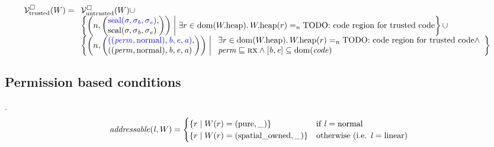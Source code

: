 \documentclass[a4paper]{article}
\begin{document}
\[
  \lrvtrusted(W) =
  \begin{array}[t]{l}
    \lrv(W)\cup \\
%
    \left\{ \npair{\left(\arraycolsep=0pt\array{l} \src{\seal{\sigma,\sigma_\baddr,\sigma_\eaddr}},\\ \seal{\sigma,\sigma_\baddr,\sigma_\eaddr} \endarray \right)} 
    \; \middle| \;
    \exists r \in \dom(\pwheap) \ldotp \pwheap(r) =_n \text{TODO: code region for trusted code}
    \right\} \cup \\
    \left\{ \npair{\left(\arraycolsep=0pt\array{l} \src{((\perm,\normal),\baddr,\eaddr,\aaddr)},\\ ((\perm,\normal),\baddr,\eaddr,\aaddr) \endarray \right)} \;\middle|\; 
    \begin{array}{l}
      \exists r \in \dom(\pwheap) \ldotp \pwheap(r) =_n \text{TODO: code region for trusted code} \wedge\\
      \perm \sqsubseteq \rx \wedge [\baddr,\eaddr] \subseteq \dom(\var{code})
    \end{array}\right\}
  \end{array}
\]

\subsection{Permission based conditions}
.
\[
  \addressable{\lin,W} =
  \begin{cases}
    \{ r \mid W(r) = (\pure,\_) \} & \text{if $\lin = \normal$} \\
    \{ r \mid W(r) = (\spatialo,\_) \}  & \text{otherwise (i.e. $\lin = \linear$)} \\
  \end{cases}
\]
\end{document}
